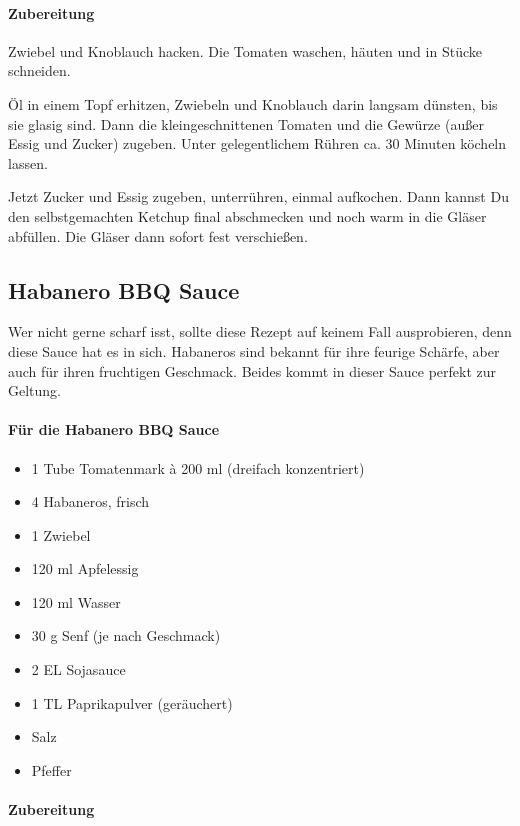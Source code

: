\paragraph{Zubereitung}

Zwiebel und Knoblauch hacken. Die Tomaten waschen, häuten und in Stücke 
schneiden.

Öl in einem Topf erhitzen, Zwiebeln und Knoblauch darin langsam dünsten, bis 
sie glasig sind.
Dann die kleingeschnittenen Tomaten und die Gewürze (außer Essig und 
Zucker) zugeben. Unter gelegentlichem
Rühren ca. 30 Minuten köcheln lassen.

Jetzt Zucker und Essig zugeben, unterrühren, einmal aufkochen. Dann kannst 
Du den selbstgemachten 
Ketchup final abschmecken und noch warm in die Gläser abfüllen. Die Gläser 
dann sofort fest verschießen.

\subsection{Habanero BBQ Sauce}
Wer nicht gerne scharf isst, sollte diese Rezept auf keinem Fall ausprobieren, 
denn diese Sauce hat es in sich. Habaneros sind bekannt für ihre feurige 
Schärfe, aber auch für ihren fruchtigen Geschmack. Beides kommt in dieser 
Sauce perfekt zur Geltung.
\newline

\paragraph{Für die Habanero BBQ Sauce}

\begin{itemize}[noitemsep]
	\item 1 Tube Tomatenmark à 200 ml (dreifach konzentriert)
	\item 4 Habaneros, frisch
	\item 1 Zwiebel
	\item 120 ml Apfelessig
	\item 120 ml Wasser
	\item 30 g Senf (je nach Geschmack)
	\item 2 EL Sojasauce
	\item 1 TL Paprikapulver (geräuchert)
	\item Salz
	\item Pfeffer
\end{itemize}

\paragraph{Zubereitung}

